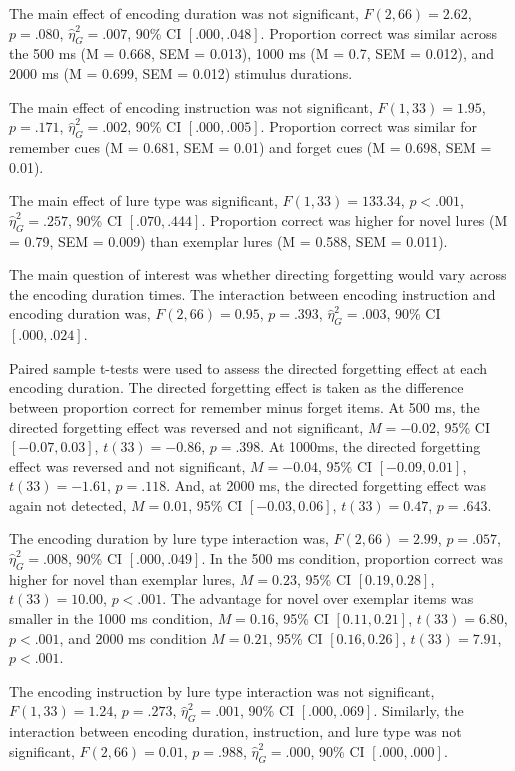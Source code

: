 \documentclass[
  english,
  man,floatsintext]{apa6}
\begin{document}
The main effect of encoding duration was not significant, \(F(2, 66) = 2.62\), \(p = .080\), \(\hat{\eta}^2_G = .007\), 90\% CI \([.000, .048]\). Proportion correct was similar across the 500 ms (M = 0.668, SEM = 0.013), 1000 ms (M = 0.7, SEM = 0.012), and 2000 ms (M = 0.699, SEM = 0.012) stimulus durations.

The main effect of encoding instruction was not significant, \(F(1, 33) = 1.95\), \(p = .171\), \(\hat{\eta}^2_G = .002\), 90\% CI \([.000, .005]\). Proportion correct was similar for remember cues (M = 0.681, SEM = 0.01) and forget cues (M = 0.698, SEM = 0.01).

The main effect of lure type was significant, \(F(1, 33) = 133.34\), \(p < .001\), \(\hat{\eta}^2_G = .257\), 90\% CI \([.070, .444]\). Proportion correct was higher for novel lures (M = 0.79, SEM = 0.009) than exemplar lures (M = 0.588, SEM = 0.011).

The main question of interest was whether directing forgetting would vary across the encoding duration times. The interaction between encoding instruction and encoding duration was, \(F(2, 66) = 0.95\), \(p = .393\), \(\hat{\eta}^2_G = .003\), 90\% CI \([.000, .024]\).

Paired sample t-tests were used to assess the directed forgetting effect at each encoding duration. The directed forgetting effect is taken as the difference between proportion correct for remember minus forget items. At 500 ms, the directed forgetting effect was reversed and not significant, \(M = -0.02\), 95\% CI \([-0.07, 0.03]\), \(t(33) = -0.86\), \(p = .398\). At 1000ms, the directed forgetting effect was reversed and not significant, \(M = -0.04\), 95\% CI \([-0.09, 0.01]\), \(t(33) = -1.61\), \(p = .118\). And, at 2000 ms, the directed forgetting effect was again not detected, \(M = 0.01\), 95\% CI \([-0.03, 0.06]\), \(t(33) = 0.47\), \(p = .643\).

The encoding duration by lure type interaction was, \(F(2, 66) = 2.99\), \(p = .057\), \(\hat{\eta}^2_G = .008\), 90\% CI \([.000, .049]\). In the 500 ms condition, proportion correct was higher for novel than exemplar lures, \(M = 0.23\), 95\% CI \([0.19, 0.28]\), \(t(33) = 10.00\), \(p < .001\). The advantage for novel over exemplar items was smaller in the 1000 ms condition, \(M = 0.16\), 95\% CI \([0.11, 0.21]\), \(t(33) = 6.80\), \(p < .001\), and 2000 ms condition \(M = 0.21\), 95\% CI \([0.16, 0.26]\), \(t(33) = 7.91\), \(p < .001\).

The encoding instruction by lure type interaction was not significant, \(F(1, 33) = 1.24\), \(p = .273\), \(\hat{\eta}^2_G = .001\), 90\% CI \([.000, .069]\). Similarly, the interaction between encoding duration, instruction, and lure type was not significant, \(F(2, 66) = 0.01\), \(p = .988\), \(\hat{\eta}^2_G = .000\), 90\% CI \([.000, .000]\).
\end{document}
